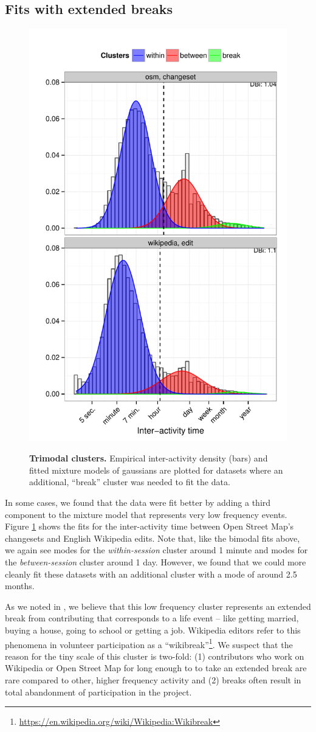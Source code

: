\subsection{Fits with extended breaks}
\begin{figure}
\centering
\includegraphics[width=.45\textwidth]{figures/trimodal_clusters.pdf}
\label{fig:trimodal_clusters}
\caption{
    \textbf{Trimodal clusters.} Empirical inter-activity density (bars) and fitted mixture models of gaussians are plotted for datasets where an additional, ``break'' cluster was needed to fit the data.
}
\end{figure}
In some cases, we found that the data were fit better by adding a third component to the mixture model that represents very low frequency events.  Figure \ref{fig:trimodal_clusters} shows the fits for the inter-activity time between Open Street Map's changesets and English Wikipedia edits.  Note that, like the bimodal fits above, we again see modes for the \emph{within-session} cluster around 1 minute and modes for the \emph{between-session} cluster around 1 day.  However, we found that we could more cleanly fit these datasets with an additional cluster with a mode of around 2.5 months.

As we noted in \cite{geiger13using}, we believe that this low frequency cluster represents an extended break from contributing that corresponds to a life event -- like getting married, buying a house, going to school or getting a job.  Wikipedia editors refer to this phenomena in volunteer participation as a ``wikibreak''\footnote{\url{https://en.wikipedia.org/wiki/Wikipedia:Wikibreak}}.  We suspect that the reason for the tiny scale of this cluster is two-fold: (1) contributors who work on Wikipedia or Open Street Map for long enough to to take an extended break are rare compared to other, higher frequency activity and (2) breaks often result in total abandonment of participation in the project.

